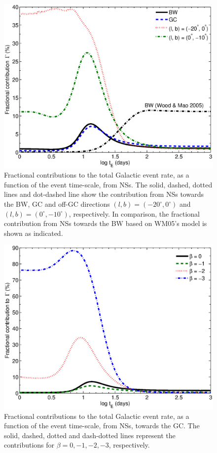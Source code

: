 \documentclass[iop,apj]{emulateapj}
\begin{document}
%
\begin{figure}
\begin{center}
  \includegraphics[width=3.5 in]{ratio.eps}
%
\caption{Fractional contributions to the total Galactic event rate, as a function of
the event time-scale, from NSs. The solid, dashed, dotted lines and dot-dashed line show
the contribution from NSs towards the BW, GC and off-GC directions $(l,b)=(-20^{\circ},0^{\circ})$
and $(l,b)=(0^{\circ},-10^{\circ})$, respectively. In comparison, the fractional
contribution from NSs towards the BW based on WM05's model is shown as indicated.}
\label{ratio}
\end{center}
\end{figure}
%
%
%
\begin{figure}
\begin{center}
  \includegraphics[width=3.5 in]{ratio_beta.eps}
%
\caption{Fractional contributions to the total Galactic event rate, as a function of
the event time-scale, from NSs, towards the GC. The solid, dashed, dotted and
dash-dotted lines represent the contributions for $\beta=0,-1,-2,-3$, respectively.}
\label{ratio_beta}
\end{center}
\end{figure}
\end{document}
